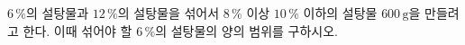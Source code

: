 $6\,\%$의 설탕물과 $12\,\%$의 설탕물을 섞어서 $8\,\%$ 이상 $10\,\%$ 이하의 설탕물 $600\,\mathrm{g}$을 만들려고 한다. 이때 섞어야 할 $6\,\%$의 설탕물의 양의 범위를 구하시오.
